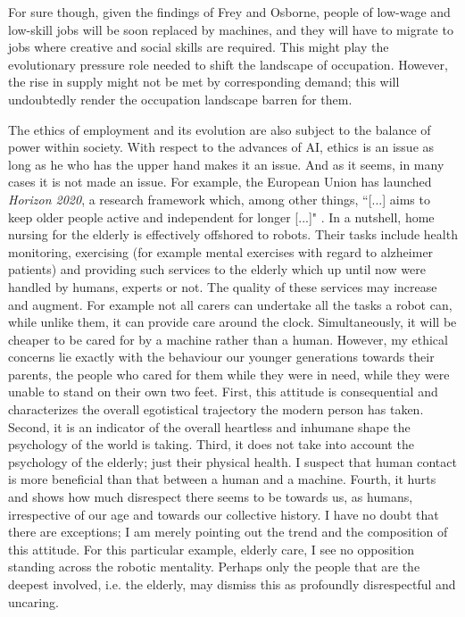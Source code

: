 \documentclass[12pt]{article}
\begin{document}
For sure though, given the findings of Frey and Osborne, people of low-wage and low-skill jobs will be soon replaced by machines, and they will have to migrate to jobs where creative and social skills are required. This might play the evolutionary pressure role needed to shift the landscape of occupation. However, the rise in supply might not be met by corresponding demand; this will undoubtedly render the occupation landscape barren for them.


The ethics of employment and its evolution are also subject to the balance of power within society. With respect to the advances of AI, ethics is an issue as long as he who has the upper hand makes it an issue. And as it seems, in many cases it is not made an issue. For example, the European Union has launched \textit{Horizon 2020}, a research framework which, among other things, ``[...] aims to keep older people active and independent for longer [...]" \cite{H20}. In a nutshell, home nursing for the elderly is effectively offshored to robots. Their tasks include health monitoring, exercising (for example mental exercises with regard to alzheimer patients) and providing such services to the elderly which up until now were handled by humans, experts or not. The quality of these services may increase and augment. For example not all carers can undertake all the tasks a robot can, while unlike them, it can provide care around the clock. Simultaneously, it will be cheaper to be cared for by a machine rather than a human. However, my ethical concerns lie exactly with the behaviour our younger generations towards their parents, the people who cared for them while they were in need, while they were unable to stand on their own two feet. First, this attitude is consequential and characterizes the overall egotistical trajectory the modern person has taken. Second, it is an indicator of the overall heartless and inhumane shape the psychology of the world is taking. Third, it does not take into account the psychology of the elderly; just their physical health. I suspect that human contact is more beneficial than that between a human and a machine. Fourth, it hurts and shows how much disrespect there seems to be towards us, as humans, irrespective of our age and towards our collective history. I have no doubt that there are exceptions; I am merely pointing out the trend and the composition of this attitude. For this particular example, elderly care, I see no opposition standing across the robotic mentality. Perhaps only the people that are the deepest involved, i.e. the elderly, may dismiss this as profoundly disrespectful and uncaring.




\end{document}
